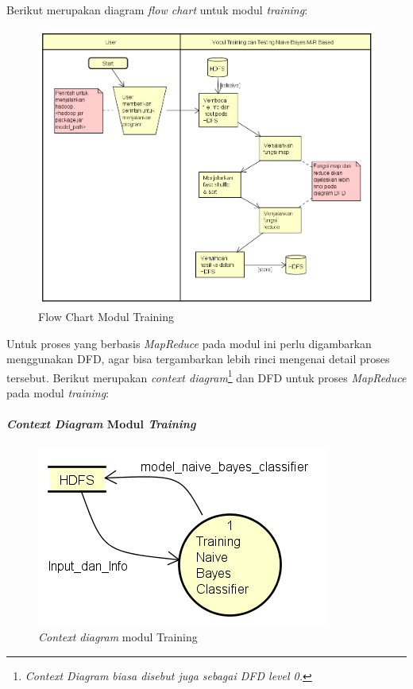 Berikut merupakan diagram \textit{flow chart} untuk modul \textit{training}:

\begin{figure}[H]
	\centering
	\includegraphics[scale=0.65]{Diagram/Flowchart_Training_Testing_MR}
	\caption[Flow Chart Modul Training]{Flow Chart Modul Training}
	\label{fig:Flow Chart Modul Training}
\end{figure}

Untuk proses yang berbasis \textit{MapReduce} pada modul ini perlu digambarkan menggunakan DFD, agar bisa tergambarkan lebih rinci mengenai detail proses tersebut. Berikut merupakan \textit{context diagram}\footnote{\textit{Context Diagram biasa disebut juga sebagai DFD level 0.}} dan DFD untuk proses \textit{MapReduce} pada modul \textit{training}:

\paragraph{\textit{Context Diagram} Modul \textit{Training}}
\label{par:contextdiagramTraining}

\begin{figure}[H]
	\label{DFD_0_Training}
	\centering
	\includegraphics[scale=0.65]{Diagram/DFD_0_Training}
	\caption[\textit{Context diagram} modul Training]{\textit{Context diagram} modul Training}
	\label{fig:Context diagram modul Training}
\end{figure}

